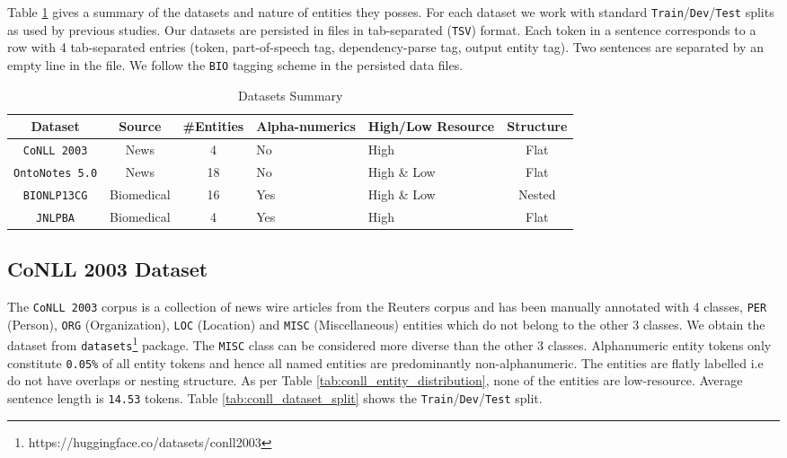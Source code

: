 Table \ref{tab:datasets_summary} gives a summary of the datasets and nature of entities they posses. For each dataset we work with standard \texttt{Train}/\texttt{Dev}/\texttt{Test} splits as used by previous studies. Our datasets are persisted in files in tab-separated (\texttt{TSV}) format. Each token in a sentence corresponds to a row with 4 tab-separated entries (token, part-of-speech tag, dependency-parse tag, output entity tag). Two sentences are separated by an empty line in the file. We follow the \texttt{BIO} tagging scheme in the persisted data files.

\begin{table}[h!]
	\begin{tabular}{|c|c|c|p{5em}|p{6em}|c|}\hline
	\textbf{Dataset} & \textbf{Source} & \textbf{\#Entities} & \textbf{Alpha-numerics} & \textbf{High/Low Resource} & \textbf{Structure}\\\hline
	\texttt{CoNLL 2003} & News & 4 & No & High & Flat\\\hline
	\texttt{OntoNotes 5.0} & News & 18 & No & High \& Low & Flat\\\hline
	\texttt{BIONLP13CG} & Biomedical & 16 & Yes & High \& Low & Nested\\\hline
	\texttt{JNLPBA} & Biomedical & 4 & Yes & High & Flat\\\hline
	\end{tabular}
	\caption{Datasets Summary}
	\label{tab:datasets_summary}
\end{table}

\subsection{CoNLL 2003 Dataset}

The \texttt{CoNLL 2003}\cite{sang2003introduction} corpus is a collection of news wire articles from the Reuters corpus and has been manually annotated with 4 classes, \texttt{PER} (Person), \texttt{ORG} (Organization), \texttt{LOC} (Location) and \texttt{MISC} (Miscellaneous) entities which do not belong to the other 3 classes. We obtain the dataset from \texttt{datasets}\footnote{https://huggingface.co/datasets/conll2003} package. The \texttt{MISC} class can be considered more diverse than the other 3 classes. Alphanumeric entity tokens only constitute \texttt{0.05\%} of all entity tokens and hence all named entities are predominantly non-alphanumeric. The entities are flatly labelled i.e do not have overlaps or nesting structure. As per Table \ref{tab:conll_entity_distribution}, none of the entities are low-resource. Average sentence length is \texttt{14.53} tokens. Table \ref{tab:conll_dataset_split} shows the \texttt{Train}/\texttt{Dev}/\texttt{Test} split. 

